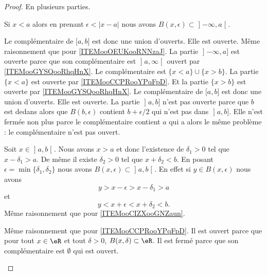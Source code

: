 \begin{proof}
	En plusieurs parties.
	\begin{subproof}
		Si \( x<a\) alors en prenant \( \epsilon<| x-a |\) nous avons \( B(x,\epsilon)\subset \mathopen] -\infty,a\mathclose[\).

			Le complémentaire de \( \mathopen[ a,b\mathclose]\) est donc une union d'ouverts. Elle est ouverte.
			Même raisonnement que pour \ref{ITEMooOEUKooRNNzaJ}.
			La partie \( \mathopen] -\infty,a\mathclose]\) est ouverte parce que son complémentaire est \( \mathopen] a,\infty\mathclose[\) ouvert par \ref{ITEMooGYSQooRhqHnX}.
			Le complémentaire est \( \{ x<a \}\cup \{ x>b \}\). La partie \( \{ x<a \} \) est ouverte par \ref{ITEMooCCPRooYPqFpD}. Et la partie \( \{ x>b \}\) est ouverte par \ref{ITEMooGYSQooRhqHnX}. Le complémentaire de \( \mathopen[ a,b\mathclose]\) est donc une union d'ouverts. Elle est ouverte.
			La partie \( \mathopen] a,b\mathclose]\) n'est pas ouverte parce que \( b\) est dedans alors que \( B(b,\epsilon)\) contient \( b+\epsilon/2\) qui n'est pas dans \( \mathopen] a,b\mathclose]\). Elle n'est fermée non plus parce le complémentaire contient \( a\) qui a alors le même problème : le complémentaire n'est pas ouvert.

		Soit \( x\in \mathopen] a,b\mathclose[\). Nous avons \( x>a\) et donc l'existence de \( \delta_1>0\) tel que \( x-\delta_1>a\). De même il existe \( \delta_2>0\) tel que \( x+\delta_2<b\). En posant \( \epsilon=\min\{ \delta_1,\delta_2 \}\) nous avons \( B(x,\epsilon)\subset \mathopen] a,b\mathclose[\). En effet si \( y\in B(x,\epsilon)\) nous avons
		\begin{equation}
			y>x-\epsilon>x-\delta_1>a
		\end{equation}
		et
		\begin{equation}
			y<x+\epsilon<x+\delta_2<b.
		\end{equation}
		Même raisonnement que pour \ref{ITEMooCIZXooGNZaun}.

		Même raisonnement que pour \ref{ITEMooCCPRooYPqFpD}.
		Il est ouvert parce que pour tout \( x\in \eR \) et tout \( \delta>0\), \( B(x,\delta)\subset \eR\). Il est fermé parce que son complémentaire est \( \emptyset\) qui est ouvert.
	\end{subproof}
\end{proof}

